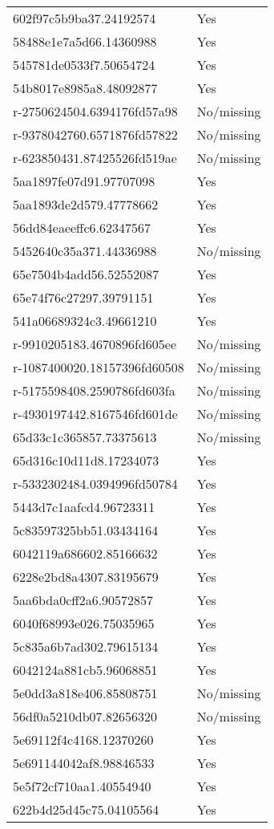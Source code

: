 \begin{tabular}{ll}
602f97c5b9ba37.24192574 & Yes \\
58488e1e7a5d66.14360988 & Yes \\
545781de0533f7.50654724 & Yes \\
54b8017e8985a8.48092877 & Yes \\
r-2750624504.6394176fd57a98 & No/missing \\
r-9378042760.6571876fd57822 & No/missing \\
r-623850431.87425526fd519ae & No/missing \\
5aa1897fe07d91.97707098 & Yes \\
5aa1893de2d579.47778662 & Yes \\
56dd84eaeeffc6.62347567 & Yes \\
5452640c35a371.44336988 & No/missing \\
65e7504b4add56.52552087 & Yes \\
65e74f76c27297.39791151 & Yes \\
541a06689324c3.49661210 & Yes \\
r-9910205183.4670896fd605ee & No/missing \\
r-1087400020.18157396fd60508 & No/missing \\
r-5175598408.2590786fd603fa & No/missing \\
r-4930197442.8167546fd601de & No/missing \\
65d33c1c365857.73375613 & No/missing \\
65d316c10d11d8.17234073 & Yes \\
r-5332302484.0394996fd50784 & Yes \\
5443d7c1aafcd4.96723311 & Yes \\
5c83597325bb51.03434164 & Yes \\
6042119a686602.85166632 & Yes \\
6228e2bd8a4307.83195679 & Yes \\
5aa6bda0cff2a6.90572857 & Yes \\
6040f68993e026.75035965 & Yes \\
5c835a6b7ad302.79615134 & Yes \\
6042124a881cb5.96068851 & Yes \\
5e0dd3a818e406.85808751 & No/missing \\
56df0a5210db07.82656320 & No/missing \\
5e69112f4c4168.12370260 & Yes \\
5e691144042af8.98846533 & Yes \\
5e5f72cf710aa1.40554940 & Yes \\
622b4d25d45c75.04105564 & Yes \\

\end{tabular}
